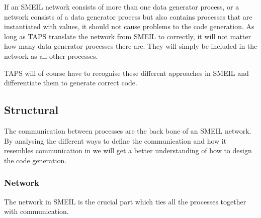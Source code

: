 If an SMEIL network consists of more than one data generator process, or a network consists of a data generator process but also contains processes that are instantiated with values, it should not cause problems to the \cspm{} code generation. As long as TAPS translate the network from SMEIL to \cspm{} correctly, it will not matter how many data generator processes there are. They will simply be included in the network as all other processes.

TAPS will of course have to recognise these different approaches in SMEIL and differentiate them to generate correct \cspm{} code.

\subsection{Structural}
\label{sec:analysis_structural}
The communication between processes are the back bone of an SMEIL network. By analysing the different ways to define the communication and how it resembles communication in \cspm{} we will get a better understanding of how to design the code generation.
\subsubsection{Network}
The network in SMEIL is the crucial part which ties all the processes together with communication.

